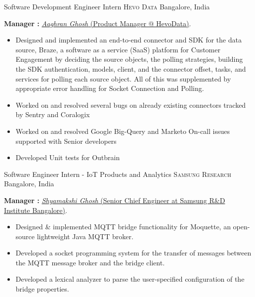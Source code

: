 \documentclass[11pt,a4paper,sans]{moderncv} %
\begin{document}
{Software Development Engineer Intern}
{\textsc{Hevo Data}}
{Bangalore, India}
{}
{
    \textbf{ Manager :} \href{https://www.linkedin.com/in/aaghran/}{\textit{Aaghran Ghosh } (Product Manager @ HevoData)}.
    \begin{itemize}
        \item{Designed and implemented an end-to-end connector and SDK for the data source, Braze, a software as a service (SaaS) platform for Customer Engagement by deciding the source objects, the polling strategies, building the SDK authentication, models, client, and the connector offset, tasks, and services for polling each source object. All of this was supplemented by appropriate error handling for Socket Connection and Polling.}
        \item{Worked on and resolved several bugs on already existing connectors tracked by Sentry and Coralogix}
        \item{Worked on and resolved Google Big-Query and Marketo On-call issues supported with Senior developers}
        \item{Developed Unit tests for Outbrain}
    \end{itemize}
}

{Software Engineer Intern - IoT Products and Analytics}
{\textsc{Samsung Research}}
{Bangalore, India}
{}
{
    \textbf{ Manager :} \href{https://www.linkedin.com/in/shyamakshi/}{\textit{Shyamakshi Ghosh} (Senior Chief Engineer at Samsung R\&D Institute Bangalore)}.
    \begin{itemize}
        \item{Designed \& implemented MQTT bridge functionality for Moquette, an open-source lightweight Java MQTT broker.}
        \item{Developed a socket programming system for the transfer of messages between the MQTT message broker and the bridge client.}
        \item{Developed a lexical analyzer to parse the user-specified configuration of the bridge properties.}
    \end{itemize}
}

\end{document}
